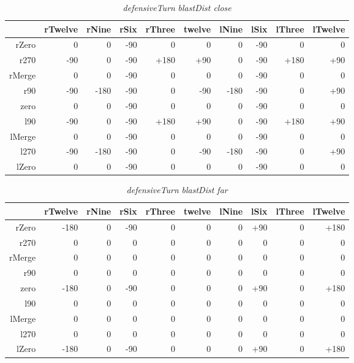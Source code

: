 \begin{table}[H]
\centering
\caption{\emph{defensiveTurn} \emph{blastDist close}}
\label{Turn rule table}
\begin{tabular}{r|r|r|r|r|r|r|r|r|r}
 		& rTwelve 	& rNine 	& rSix 		& rThree 		& twelve 	& lNine 	& lSix 		& lThree	& lTwelve		\\ \hline
rZero	& 0			& 0			& -90		& 0 		 	& 0			& 0			& -90	 	& 0			& 0				\\
r270	& -90		& 0			& -90		& +180			& +90		& 0			& -90		& +180		& +90			\\
rMerge	& 0			& 0			& -90	 	& 0				& 0			& 0			& -90		& 0			& 0				\\
r90		& -90		& -180		& -90 		& 0				& -90		& -180		& -90		& 0			& +90			\\
zero 	& 0			& 0 		& -90 		& 0				& 0			& 0			& -90		& 0			& 0				\\
l90 	& -90		& 0 		& -90		& +180			& +90		& 0			& -90		& +180		& +90			\\
lMerge	& 0			& 0 		& -90 		& 0				& 0			& 0			& -90		& 0			& 0				\\
l270 	& -90		& -180 		& -90		& 0				& -90		& -180		& -90		& 0			& +90			\\
lZero 	& 0			& 0 		& -90	 	& 0				& 0			& 0  		& -90		& 0			& 0				
\end{tabular}
\end{table}

\begin{table}[H]
\centering
\caption{\emph{defensiveTurn} \emph{blastDist far}}
\label{Turn rule table}
\begin{tabular}{r|r|r|r|r|r|r|r|r|r}
 		& rTwelve 	& rNine 	& rSix 		& rThree 	& twelve 	& lNine 	& lSix 		& lThree	& lTwelve	\\ \hline
rZero	& -180		& 0			& -90		& 0 	 	& 0			& 0			& +90		& 0			& +180		\\
r270	& 0			& 0			& 0			& 0			& 0			& 0			& 0			& 0			& 0			\\
rMerge	& 0			& 0			& 0	 		& 0			& 0			& 0			& 0			& 0			& 0			\\
r90		& 0			& 0			& 0 		& 0			& 0			& 0			& 0			& 0			& 0			\\
zero 	& -180		& 0 		& -90 		& 0			& 0			& 0			& +90		& 0			& +180		\\
l90 	& 0			& 0 		& 0			& 0			& 0			& 0			& 0			& 0			& 0			\\
lMerge	& 0			& 0 		& 0	 		& 0			& 0			& 0			& 0			& 0			& 0			\\
l270 	& 0			& 0	 		& 0 		& 0			& 0			& 0			& 0			& 0			& 0			\\
lZero 	& -180		& 0 		& -90 		& 0			& 0			& 0  		& +90		& 0			& +180		
\end{tabular}
\end{table}

